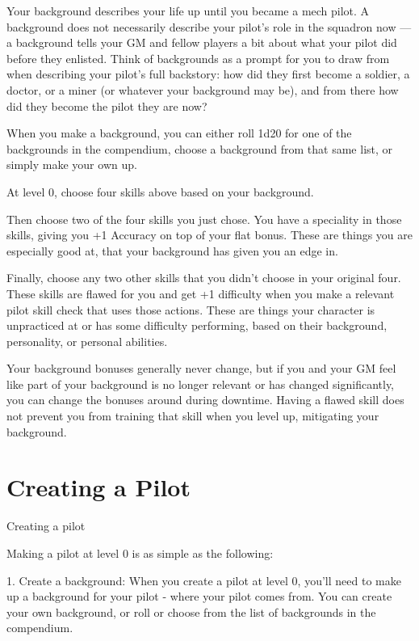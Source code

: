 Your background describes your life up until you became a mech pilot. A background does not
necessarily describe your pilot’s role in the squadron now — a background tells your GM and
fellow players a bit about what your pilot did before they enlisted. Think of backgrounds as a
prompt for you to draw from when describing your pilot’s full backstory: how did they first
become a soldier, a doctor, or a miner (or whatever your background may be), and from there
how did they become the pilot they are now?


When you make a background, you can either roll 1d20 for one of the backgrounds in the
compendium, choose a background from that same list, or simply make your own up.


At level 0, choose four skills above based on your background.

Then choose two of the four skills you just chose. You have a speciality in those skills, giving
you +1 Accuracy on top of your flat bonus. These are things you are especially good at, that
your background has given you an edge in.





Finally, choose any two other skills that you didn’t choose in your original four. These skills are
flawed for you and get +1 difficulty when you make a relevant pilot skill check that uses those
actions. These are things your character is unpracticed at or has some difficulty performing,
based on their background, personality, or personal abilities.


Your background bonuses generally never change, but if you and your GM feel like part of your
background is no longer relevant or has changed significantly, you can change the bonuses
around during downtime. Having a flawed skill does not prevent you from training that skill when
you level up, mitigating your background.

\chapter{Creating a Pilot}
                                              Creating a pilot

Making a pilot at level 0 is as simple as the following:


     1.  Create a background: When you create a pilot at level 0, you’ll need to make up a
         background for your pilot - where your pilot comes from. You can create your own
         background, or roll or choose from the list of backgrounds in the compendium.

